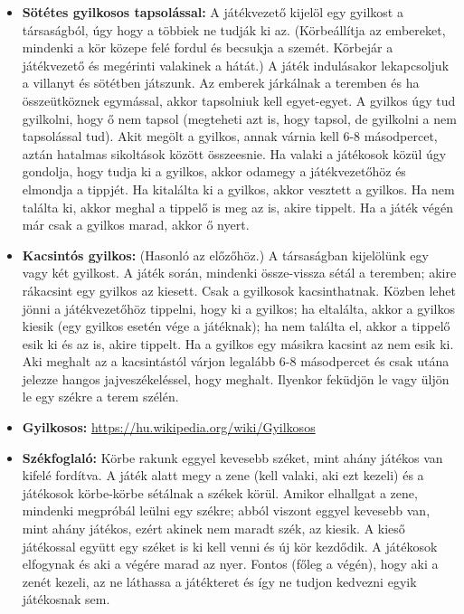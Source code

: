 \documentclass[a4paper, 12pt, twoside, openright]{article}
\begin{document}
\begin{itemize}
\item \textbf{Sötétes gyilkosos tapsolással:} A játékvezető kijelöl egy gyilkost a társaságból, úgy hogy a többiek ne tudják ki az. (Körbeállítja az embereket, mindenki a kör közepe felé fordul és becsukja a szemét. Körbejár a játékvezető és megérinti valakinek a hátát.) A játék indulásakor lekapcsoljuk a villanyt és sötétben játszunk. Az emberek járkálnak a teremben és ha összeütköznek egymással, akkor tapsolniuk kell egyet-egyet. A gyilkos úgy tud gyilkolni, hogy ő nem tapsol (megteheti azt is, hogy tapsol, de gyilkolni a nem tapsolással tud). Akit megölt a gyilkos, annak várnia kell 6-8 másodpercet, aztán hatalmas sikoltások között összeesnie. Ha valaki a játékosok közül úgy gondolja, hogy tudja ki a gyilkos, akkor odamegy a játékvezetőhöz és elmondja a tippjét. Ha kitalálta ki a gyilkos, akkor vesztett a gyilkos. Ha nem találta ki, akkor meghal a tippelő is meg az is, akire tippelt. Ha a játék végén már csak a gyilkos marad, akkor ő nyert.

\item \textbf{Kacsintós gyilkos:} (Hasonló az előzőhöz.) A társaságban kijelölünk egy vagy két gyilkost. A játék során, mindenki össze-vissza sétál a teremben; akire rákacsint egy gyilkos az kiesett. Csak a gyilkosok kacsinthatnak. Közben lehet jönni a játékvezetőhöz tippelni, hogy ki a gyilkos; ha eltalálta, akkor a gyilkos kiesik (egy gyilkos esetén vége a játéknak); ha nem találta el, akkor a tippelő esik ki és az is, akire tippelt. Ha a gyilkos egy másikra kacsint az nem esik ki. Aki meghalt az a kacsintástól várjon legalább 6-8 másodpercet és csak utána jelezze hangos jajveszékeléssel, hogy meghalt. Ilyenkor feküdjön le vagy üljön le egy székre a terem szélén.

\item \textbf{Gyilkosos:} \url{https://hu.wikipedia.org/wiki/Gyilkosos}

\item \textbf{Székfoglaló:} Körbe rakunk eggyel kevesebb széket, mint ahány játékos van kifelé fordítva. A játék alatt megy a zene (kell valaki, aki ezt kezeli) és a játékosok körbe-körbe sétálnak a székek körül. Amikor elhallgat a zene, mindenki megpróbál leülni egy székre; abból viszont eggyel kevesebb van, mint ahány játékos, ezért akinek nem maradt szék, az kiesik. A kieső játékossal együtt egy széket is ki kell venni és új kör kezdődik. A játékosok elfogynak és aki a végére marad az nyer. Fontos (főleg a végén), hogy aki a zenét kezeli, az ne láthassa a játékteret és így ne tudjon kedvezni egyik játékosnak sem.


\end{itemize}
\end{document}
